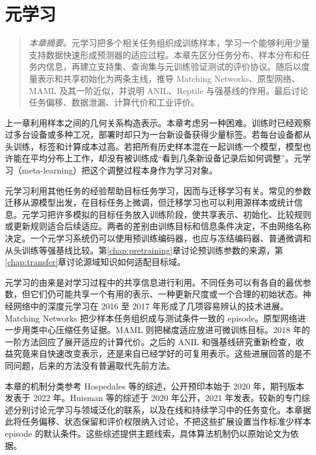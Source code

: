 \chapter{元学习}
\label{chap:meta}
\begin{quote}\small
\textit{本章摘要。}元学习把多个相关任务组织成训练样本，学习一个能够利用少量支持数据快速形成预测器的适应过程。本章先区分任务分布、样本分布和任务内信息，再建立支持集、查询集与元训练验证测试的评价协议。随后以度量表示和共享初始化为两条主线，推导 Matching Networks、原型网络、MAML 及其一阶近似，并说明 ANIL、Reptile 与强基线的作用。最后讨论任务偏移、数据泄漏、计算代价和工业评价。
\end{quote}

上一章利用样本之间的几何关系构造表示。本章考虑另一种困难。训练时已经观察过多台设备或多种工况，部署时却只为一台新设备获得少量标签。若每台设备都从头训练，标签和计算成本过高。若把所有历史样本混在一起训练一个模型，模型也许能在平均分布上工作，却没有被训练成“看到几条新设备记录后如何调整”。元学习（meta-learning）把这个调整过程本身作为学习对象。

元学习利用其他任务的经验帮助目标任务学习，因而与迁移学习有关。常见的参数迁移从源模型出发，在目标任务上微调，但迁移学习也可以利用源样本或统计信息。元学习把许多模拟的目标任务放入训练阶段，使共享表示、初始化、比较规则或更新规则适合后续适应。两者的差别由训练目标和信息条件决定，不由网络名称决定。一个元学习系统仍可以使用预训练编码器，也应与冻结编码器、普通微调和从头训练等强基线比较。第\ref{chap:pretraining}章讨论预训练参数的来源，第\ref{chap:transfer}章讨论源域知识如何适配目标域。

元学习的由来是对学习过程中的共享信息进行利用。不同任务可以有各自的最优参数，但它们仍可能共享一个有用的表示、一种更新尺度或一个合理的初始状态。神经网络中的深度元学习在 2016 至 2017 年形成了几项容易辨认的技术进展。Matching Networks 把少样本任务组织成与测试条件一致的 episode。原型网络进一步用类中心压缩任务证据。MAML 则把梯度适应放进可微训练目标。2018 年的一阶方法回应了展开适应的计算代价。之后的 ANIL 和强基线研究重新检查，收益究竟来自快速改变表示，还是来自已经学好的可复用表示。这些进展回答的是不同问题，后来的方法没有普遍取代先前方法。

本章的机制分类参考 Hospedales 等的综述，公开预印本始于 2020 年，期刊版本发表于 2022 年\cite{hospedales2022meta}。Huisman 等的综述于 2020 年公开，2021 年发表\cite{huisman2021deepmeta}。较新的专门综述分别讨论元学习与领域泛化的联系，以及在线和持续学习中的任务变化\cite{khoee2024metadg,son2025metaonline}。本章据此将任务偏移、状态保留和评价权限纳入讨论，不把这些扩展设置当作标准少样本 episode 的默认条件。这些综述提供主题线索，具体算法机制仍以原始论文为依据。

